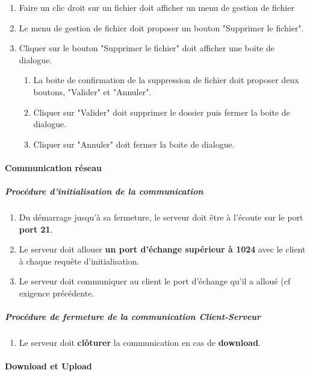 \documentclass[10pt,a4paper]{report}
\begin{document}
\begin{enumerate}
		\item Faire un clic droit sur un fichier doit afficher un menu de gestion de fichier
		\item Le menu de gestion de fichier doit proposer un bouton "Supprimer le fichier".
		\item Cliquer sur le bouton "Supprimer le fichier" doit afficher une boite de dialogue.
		\begin{enumerate}[label=\arabic*.]
			\item La boite de confirmation de la suppression de fichier doit proposer deux boutons, "Valider" et "Annuler".
			\item Cliquer sur "Valider" doit supprimer le dossier puis fermer la boite de dialogue.
			\item Cliquer sur "Annuler" doit fermer la boite de dialogue.
		\end{enumerate}
	\end{enumerate}	
	
\paragraph{Communication réseau}

	\subparagraph{Procédure d'initialisation de la communication}

		\begin{enumerate}
			\item  Du démarrage jusqu'à sa fermeture, le serveur doit être à l'écoute sur le port \textbf{port 21}.

			\item Le serveur doit allouer \textbf{un port d'échange supérieur à 1024} avec le client à chaque requête d'initialisation.

			\item Le serveur doit communiquer au client le port d'échange qu'il a alloué (cf exigence précédente.

		\end{enumerate}
		
\subparagraph{Procédure de fermeture de la communication Client-Serveur}

	\begin{enumerate}
		\item Le serveur doit \textbf{clôturer} la communication en cas de \textbf{download}. 
	\end{enumerate}

\paragraph{Download et Upload}
	
\end{document}
